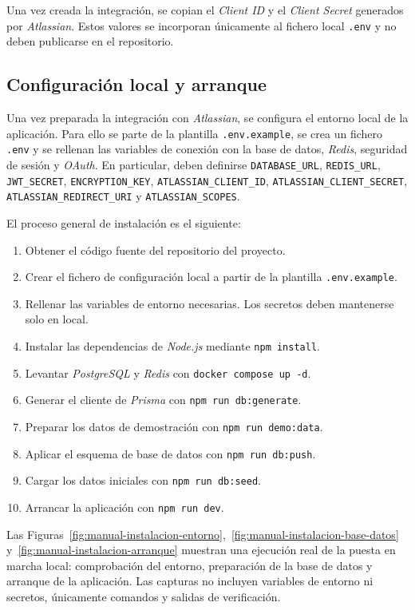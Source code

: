 \begin{refsection}
Una vez creada la integración, se copian el \textit{Client ID} y el \textit{Client Secret} generados por \textit{Atlassian}. Estos valores se incorporan únicamente al fichero local \texttt{.env} y no deben publicarse en el repositorio.

\subsection{Configuración local y arranque}

Una vez preparada la integración con \textit{Atlassian}, se configura el entorno local de la aplicación. Para ello se parte de la plantilla \texttt{.env.example}, se crea un fichero \texttt{.env} y se rellenan las variables de conexión con la base de datos, \textit{Redis}, seguridad de sesión y \textit{OAuth}. En particular, deben definirse \texttt{DATABASE\_URL}, \texttt{REDIS\_URL}, \texttt{JWT\_SECRET}, \texttt{ENCRYPTION\_KEY}, \texttt{ATLASSIAN\_CLIENT\_ID}, \texttt{ATLASSIAN\_CLIENT\_SECRET}, \texttt{ATLASSIAN\_REDIRECT\_URI} y \texttt{ATLASSIAN\_SCOPES}.

El proceso general de instalación es el siguiente:

\begin{enumerate}
    \item Obtener el código fuente del repositorio del proyecto.
    \item Crear el fichero de configuración local a partir de la plantilla \texttt{.env.example}.
    \item Rellenar las variables de entorno necesarias. Los secretos deben mantenerse solo en local.
    \item Instalar las dependencias de \textit{Node.js} mediante \texttt{npm install}.
    \item Levantar \textit{PostgreSQL} y \textit{Redis} con \texttt{docker compose up -d}.
    \item Generar el cliente de \textit{Prisma} con \texttt{npm run db:generate}.
    \item Preparar los datos de demostración con \texttt{npm run demo:data}.
    \item Aplicar el esquema de base de datos con \texttt{npm run db:push}.
    \item Cargar los datos iniciales con \texttt{npm run db:seed}.
    \item Arrancar la aplicación con \texttt{npm run dev}.
\end{enumerate}

Las Figuras~\ref{fig:manual-instalacion-entorno},~\ref{fig:manual-instalacion-base-datos} y~\ref{fig:manual-instalacion-arranque} muestran una ejecución real de la puesta en marcha local: comprobación del entorno, preparación de la base de datos y arranque de la aplicación. Las capturas no incluyen variables de entorno ni secretos, únicamente comandos y salidas de verificación.


\end{refsection}
